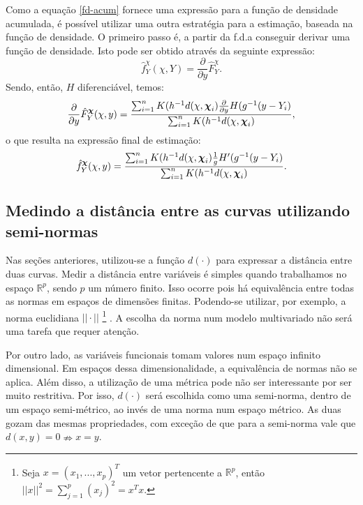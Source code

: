 \documentclass[
	12pt,				%
	openright,			%
	oneside,			%
	a4paper,			%
	english,			%
	brazil				%
	]{dissertacao-ufrgs-abntex2}
\begin{document}
Como a equação \ref{fd-acum} fornece uma expressão para a função de densidade acumulada, é possível utilizar uma outra estratégia para a estimação, baseada na função de densidade. O primeiro passo é, a partir da f.d.a conseguir derivar uma função de densidade. Isto pode ser obtido através da seguinte expressão:
\begin{equation}
\hat{f}_Y^\chi(\chi,Y)=\frac{\partial}{\partial y} \hat{F}_Y^\chi.
\end{equation}
Sendo, então, $H$ diferenciável, temos:
\begin{equation}
\frac{\partial}{\partial y} \hat{F}_{Y}^{\boldsymbol{\chi}}(\chi,y) = \frac{\sum_{i=1}^{n}K(h^{-1}d(\chi,\boldsymbol{\chi}_{i}) \frac{\partial}{\partial y} H(g^{-1}(y-Y_{i})}{\sum_{i=1}^{n}K(h^{-1}d(\chi,\boldsymbol{\chi}_{i})},
\end{equation}
o que resulta na expressão final de estimação:
\begin{equation}
\hat{f}_{Y}^{\boldsymbol{\chi}}(\chi,y) = \frac{\sum_{i=1}^{n}K(h^{-1}d(\chi,\boldsymbol{\chi}_{i}) \frac{1}{g} H'(g^{-1}(y-Y_{i})}{\sum_{i=1}^{n}K(h^{-1}d(\chi,\boldsymbol{\chi}_{i})}.
\end{equation}

\subsection{Medindo a distância entre as curvas utilizando semi-normas}

Nas seções anteriores, utilizou-se a função $d(\cdot)$ para expressar
a distância entre duas curvas. Medir a distância entre variáveis é
simples quando trabalhamos no espaço $\mathbb{R}^{p}$, sendo $p$
um número finito. Isso ocorre pois há equivalência entre todas as
normas em espaços de dimensões finitas. Podendo-se utilizar, por exemplo,
a norma euclidiana $||\cdot||$%
\footnote{Seja $x=(x_{1},...,x_{p})^{T}$ um vetor pertencente a $\mathbb{R}^{p}$,
então$||x||^{2}=\sum_{j=1}^{p}(x_{j})^{2}=x^{T}x$.%
} . A escolha da norma num modelo multivariado não será uma tarefa
que requer atenção.

Por outro lado, as variáveis funcionais tomam valores num espaço infinito
dimensional. Em espaços dessa dimensionalidade, a equivalência de normas não se
aplica. Além disso, a utilização de uma métrica pode não ser interessante
por ser muito restritiva. Por isso, $d(\cdot)$ será escolhida como
uma semi-norma, dentro de um espaço semi-métrico, ao invés de uma
norma num espaço métrico. As duas gozam das mesmas propriedades, com
exceção de que para a semi-norma vale que $d(x,y)=0\nRightarrow x=y$. 
\end{document}
